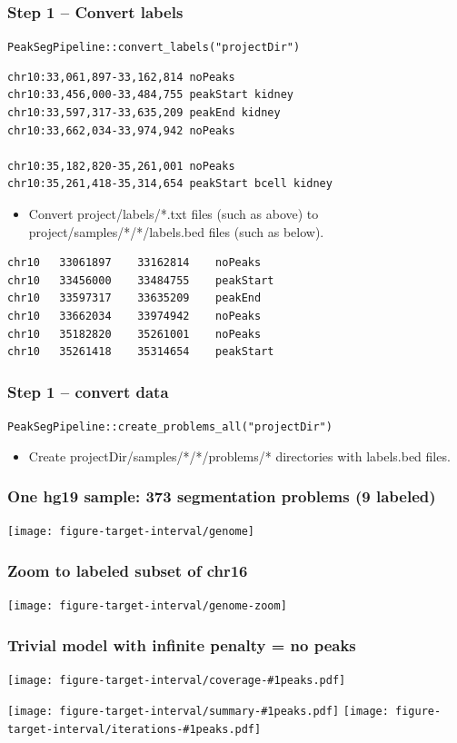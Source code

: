 \documentclass{beamer}
\begin{document}
\begin{frame}
  \frametitle{Step 1 -- Convert labels}
  \verb|PeakSegPipeline::convert_labels("projectDir")|
\begin{verbatim}
chr10:33,061,897-33,162,814 noPeaks
chr10:33,456,000-33,484,755 peakStart kidney
chr10:33,597,317-33,635,209 peakEnd kidney
chr10:33,662,034-33,974,942 noPeaks

chr10:35,182,820-35,261,001 noPeaks
chr10:35,261,418-35,314,654 peakStart bcell kidney
\end{verbatim}
  \begin{itemize}
  \item Convert project/labels/*.txt files (such as above) to
    project/samples/*/*/labels.bed files (such as below).
  \end{itemize}
\begin{verbatim}
chr10	33061897	33162814	noPeaks
chr10	33456000	33484755	peakStart
chr10	33597317	33635209	peakEnd
chr10	33662034	33974942	noPeaks
chr10	35182820	35261001	noPeaks
chr10	35261418	35314654	peakStart
\end{verbatim}
\end{frame}

\begin{frame}
  \frametitle{Step 1 -- convert data}
  \verb|PeakSegPipeline::create_problems_all("projectDir")|
  \begin{itemize}
  \item Create projectDir/samples/*/*/problems/* directories with
    labels.bed files.
  \end{itemize}
\end{frame}

\begin{frame}
  \frametitle{One hg19 sample: 373 segmentation problems (9 labeled)}
  \texttt{[image: figure-target-interval/genome]} 
\end{frame}

\begin{frame}
  \frametitle{Zoom to labeled subset of chr16}
  \texttt{[image: figure-target-interval/genome-zoom]} 
\end{frame}

\newcommand{\showboth}[1]{
  \texttt{[image: figure-target-interval/coverage-\#1peaks.pdf]}

  \texttt{[image: figure-target-interval/summary-\#1peaks.pdf]}
  \texttt{[image: figure-target-interval/iterations-\#1peaks.pdf]}
} 

\begin{frame}
  \frametitle{Trivial model with infinite penalty = no peaks}
  \showboth{0}
\end{frame}
\end{document}
